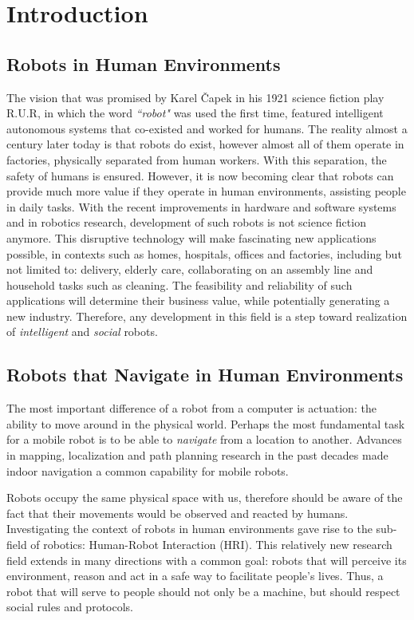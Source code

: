 \chapter{Introduction}
\label{chapter:introduction}

\section{Robots in Human Environments}

The vision that was promised by Karel \v{C}apek in his 1921 science fiction play R.U.R, in which the word \textit{``robot"} was used the first time, featured intelligent autonomous systems that co-existed and worked for humans. The reality almost a century later today is that robots do exist, however almost all of them operate in factories, physically separated from human workers. With this separation, the safety of humans is ensured. However, it is now becoming clear that robots can provide much more value if they operate in human environments, assisting people in daily tasks. With the recent improvements in hardware and software systems and in robotics research, development of such robots is not science fiction anymore. This disruptive technology will make fascinating new applications possible, in contexts such as homes, hospitals, offices and factories, including but not limited to: delivery, elderly care, collaborating on an assembly line and household tasks such as cleaning. The feasibility and reliability of such applications will determine their business value, while potentially generating a new industry. Therefore, any development in this field is a step toward realization of \textit{intelligent} and \textit{social} robots.

\section{Robots that Navigate in Human Environments}

The most important difference of a robot from a computer is actuation: the ability to move around in the physical world. Perhaps the most fundamental task for a mobile robot is to be able to \textit{navigate} from a location to another. Advances in mapping, localization and path planning research in the past decades made indoor navigation a common capability for mobile robots. 

Robots occupy the same physical space with us, therefore should be aware of the fact that their movements would be observed and reacted by humans. Investigating the context of robots in human environments gave rise to the sub-field of robotics: Human-Robot Interaction (HRI). This relatively new research field extends in many directions with a common goal: robots that will perceive its environment, reason and act in a safe way to facilitate people's lives. Thus, a robot that will serve to people should not only be a machine, but should respect social rules and protocols.

